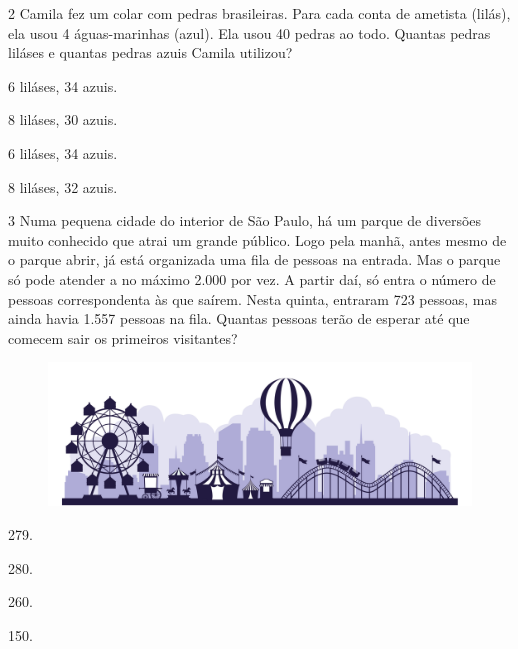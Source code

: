 \num{2} Camila fez um colar com pedras brasileiras. 
Para cada conta de ametista (lilás), ela usou 4 águas-marinhas (azul).
Ela usou 40 pedras ao todo. Quantas pedras liláses e quantas pedras azuis Camila utilizou?

\begin{multicols}{2}
\begin{escolha}
\item 6 liláses, 34 azuis.

\item 8 liláses, 30 azuis. 

\item 6 liláses, 34 azuis.

\item 8 liláses, 32 azuis.
\end{escolha}
\end{multicols}

\num{3} Numa pequena cidade do interior de São Paulo, há um parque de diversões muito conhecido que atrai um grande público. Logo pela manhã, antes mesmo de o parque abrir, já está organizada uma fila de pessoas na entrada. Mas o parque só pode atender a no máximo 2.000 por vez. A partir daí, só entra o número de pessoas correspondenta às que saírem. Nesta quinta, entraram 723 pessoas, mas ainda havia 1.557 pessoas na fila. Quantas pessoas terão de esperar até que comecem sair os primeiros visitantes?

\begin{figure}[htpb!]
\centering
\includegraphics[width=.7\textwidth]{media/image16a.jpeg}
\end{figure}

\begin{multicols}{2}
\begin{escolha}
\item 279.

\item 280.

\item 260.

\item 150.
\end{escolha}
\end{multicols}



